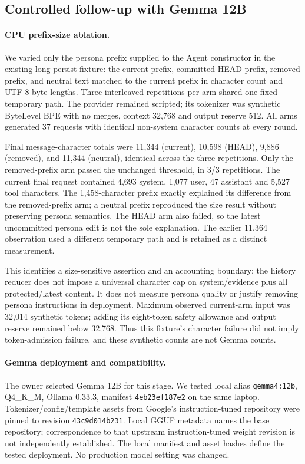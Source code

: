 \subsection{Controlled follow-up with Gemma 12B}\label{sec:followup}
\paragraph{CPU prefix-size ablation.}
We varied only the persona prefix supplied to the Agent constructor in the existing long-persist fixture: the current prefix, committed-HEAD prefix, removed prefix, and neutral text matched to the current prefix in character count and UTF-8 byte lengths. Three interleaved repetitions per arm shared one fixed temporary path. The provider remained scripted; its tokenizer was synthetic ByteLevel BPE with no merges, context 32,768 and output reserve 512. All arms generated 37 requests with identical non-system character counts at every round.

Final message-character totals were 11,344 (current), 10,598 (HEAD), 9,886 (removed), and 11,344 (neutral), identical across the three repetitions. Only the removed-prefix arm passed the unchanged threshold, in 3/3 repetitions. The current final request contained 4,693 system, 1,077 user, 47 assistant and 5,527 tool characters. The 1,458-character prefix exactly explained its difference from the removed-prefix arm; a neutral prefix reproduced the size result without preserving persona semantics. The HEAD arm also failed, so the latest uncommitted persona edit is not the sole explanation. The earlier 11,364 observation used a different temporary path and is retained as a distinct measurement.

This identifies a size-sensitive assertion and an accounting boundary: the history reducer does not impose a universal character cap on system/evidence plus all protected/latest content. It does not measure persona quality or justify removing persona instructions in deployment. Maximum observed current-arm input was 32,014 synthetic tokens; adding its eight-token safety allowance and output reserve remained below 32,768. Thus this fixture's character failure did not imply token-admission failure, and these synthetic counts are not Gemma counts.

\paragraph{Gemma deployment and compatibility.}
The owner selected Gemma 12B for this stage. We tested local alias \texttt{gemma4:12b}, Q4\_K\_M, Ollama 0.33.3, manifest \texttt{4eb23ef187e2} on the same laptop. Tokenizer/config/template assets from Google's instruction-tuned repository \cite{gemmaassets} were pinned to revision \texttt{43c9d014b231}. Local GGUF metadata names the base repository; correspondence to that upstream instruction-tuned weight revision is not independently established. The local manifest and asset hashes define the tested deployment. No production model setting was changed.

